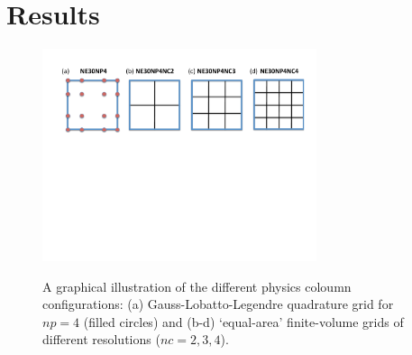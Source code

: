 \documentclass[twocol]{ametsoc}
\begin{document}
\section{Results}
\begin{figure}[t]
\noindent\includegraphics[width=19pc,angle=0]{figs/grids.pdf}\\
  \caption{A graphical illustration of the different physics coloumn configurations: (a) Gauss-Lobatto-Legendre quadrature grid for $np=4$ (filled circles) and (b-d) `equal-area' finite-volume grids of different resolutions ($nc=2,3,4$).}\label{fig:grids}
\end{figure}


\end{document}
